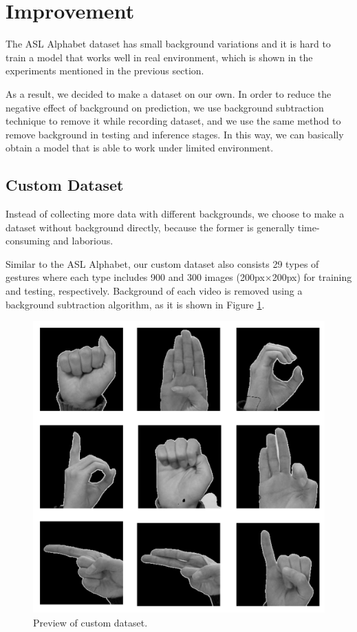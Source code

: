 \documentclass[10pt,twocolumn,letterpaper]{article}
\begin{document}
\section{Improvement}

The ASL Alphabet dataset has small background variations and it is hard to train a model that works well in real environment, which is shown in the experiments mentioned in the previous section.

As a result, we decided to make a dataset on our own. In order to reduce the negative effect of background on prediction, we use background subtraction technique to remove it while recording dataset, and we use the same method to remove background in testing and inference stages. In this way, we can basically obtain a model that is able to work under limited environment.

\subsection{Custom Dataset}

Instead of collecting more data with different backgrounds, we choose to make a dataset without background directly, because the former is generally time-consuming and laborious.

Similar to the ASL Alphabet, our custom dataset also consists 29 types of gestures where each type includes 900 and 300 images (200px$\times$200px) for training and testing, respectively. Background of each video is removed using a background subtraction algorithm, as it is shown in Figure \ref{fig:dataset}.

\begin{figure}[h]
\begin{center}
\includegraphics[width=0.8\linewidth]{imgs/dataset.png}
\end{center}
   \caption{Preview of custom dataset.}
\label{fig:dataset}
\end{figure}
\end{document}

